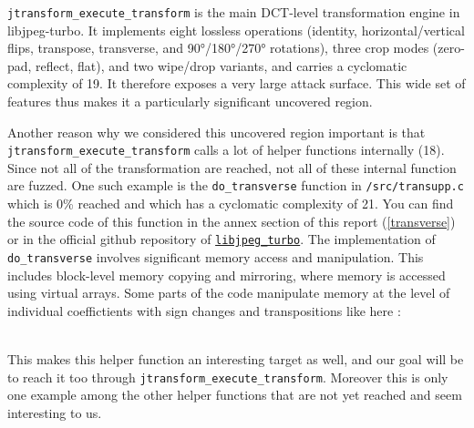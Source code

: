 \documentclass[12pt]{article}
\begin{document}
\noindent \texttt{jtransform\_execute\_transform} is the main DCT-level transformation engine in libjpeg-turbo. It implements eight lossless operations (identity, horizontal/vertical flips, transpose, transverse, and 90°/180°/270° rotations), three crop modes (zero-pad, reflect, flat), and two wipe/drop variants, and carries a cyclomatic complexity of 19. It therefore exposes a very large attack surface. This wide set of features thus makes it a particularly significant uncovered region.  


\noindent Another reason why we considered this uncovered region important is that \texttt{jtransform\_execute\_transform} calls a lot of helper functions internally (18). Since not all of the transformation are reached, not all of these internal function are fuzzed. One such example is the \texttt{do\_transverse} function in \texttt{/src/transupp.c} which is 0\% reached and which has a cyclomatic complexity of 21. You can find the source code of this function in the annex section of this report (\autoref{transverse}) or in the official github repository of \href{https://github.com/libjpeg-turbo/libjpeg-turbo/blob/main/src/transupp.c#L1246}{\texttt{libjpeg\_turbo}}. The implementation of \texttt{do\_transverse} involves significant memory access and manipulation. This includes block-level memory copying and mirroring, where memory is accessed using virtual arrays. Some parts of the code manipulate memory at the level of individual coeffictients with sign changes and transpositions like here : 


\noindent \\This makes this helper function an interesting target as well, and our goal will be to reach it too through \texttt{jtransform\_execute\_transform}. Moreover this is only one example among the other helper functions that are not yet reached and seem interesting to us. 
\end{document}
